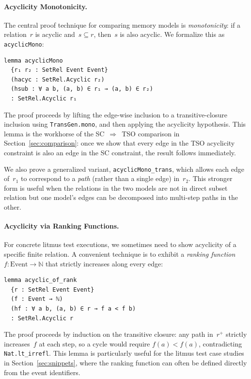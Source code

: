 \paragraph{Acyclicity Monotonicity.}
The central proof technique for comparing memory models is \emph{monotonicity}: if a
relation~$r$ is acyclic and~$s \subseteq r$, then~$s$ is also acyclic. We formalize this as
\texttt{acyclicMono}:

\begin{lstlisting}
lemma acyclicMono
  {r₁ r₂ : SetRel Event Event}
  (hacyc : SetRel.Acyclic r₂)
  (hsub : ∀ a b, (a, b) ∈ r₁ → (a, b) ∈ r₂)
  : SetRel.Acyclic r₁
\end{lstlisting}

The proof proceeds by lifting the edge-wise inclusion to a transitive-closure inclusion using
\texttt{TransGen.mono}, and then applying the acyclicity hypothesis. This lemma is the
workhorse of the SC~$\Rightarrow$~TSO comparison in Section~\ref{sec:comparison}: once we
show that every edge in the TSO acyclicity constraint is also an edge in the SC constraint,
the result follows immediately.

We also prove a generalized variant, \texttt{acyclicMono\_trans}, which allows each edge
of~$r_1$ to correspond to a \emph{path} (rather than a single edge) in~$r_2$. This stronger
form is useful when the relations in the two models are not in direct subset relation but one
model's edges can be decomposed into multi-step paths in the other.

\paragraph{Acyclicity via Ranking Functions.}
For concrete litmus test executions, we sometimes need to show acyclicity of a specific
finite relation. A convenient technique is to exhibit a \emph{ranking function}
$f : \text{Event} \to \mathbb{N}$ that strictly increases along every edge:

\begin{lstlisting}
lemma acyclic_of_rank
  {r : SetRel Event Event}
  (f : Event → ℕ)
  (hf : ∀ a b, (a, b) ∈ r → f a < f b)
  : SetRel.Acyclic r
\end{lstlisting}

The proof proceeds by induction on the transitive closure: any path in~$r^+$ strictly
increases~$f$ at each step, so a cycle would require $f(a) < f(a)$, contradicting
\texttt{Nat.lt\_irrefl}. This lemma is particularly useful for the litmus test case studies
in Section~\ref{sec:snippets}, where the ranking function can often be defined directly from the event identifiers.

